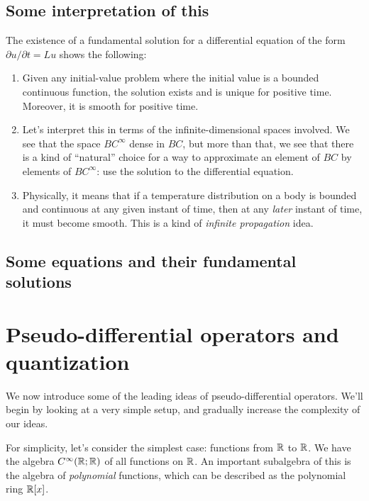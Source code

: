 \documentclass[a4paper]{amsart}
\begin{document}
\subsection{Some interpretation of this}

The existence of a fundamental solution for a differential equation of
the form $\partial u/\partial t = Lu$ shows the following:

\begin{enumerate}

\item Given any initial-value problem where the initial value is a
  bounded continuous function, the solution exists and is unique for
  positive time. Moreover, it is smooth for positive time.

\item Let's interpret this in terms of the infinite-dimensional spaces
  involved. We see that the space $BC^\infty$ dense in $BC$, but more
  than that, we see that there is a kind of ``natural'' choice for a
  way to approximate an element of $BC$ by elements of $BC^\infty$:
  use the solution to the differential equation.

\item Physically, it means that if a temperature distribution on a
  body is bounded and continuous at any given instant of time, then at
  any {\em later} instant of time, it must become smooth. This is a
  kind of {\em infinite propagation} idea.

\end{enumerate}

\subsection{Some equations and their fundamental solutions}

\section{Pseudo-differential operators and quantization}

We now introduce some of the leading ideas of pseudo-differential
operators. We'll begin by looking at a very simple setup, and
gradually increase the complexity of our ideas.

For simplicity, let's consider the simplest case: functions from $\mathbb{R}$
to $\mathbb{R}$. We have the algebra $C^\infty(\mathbb{R}; \mathbb{R})$ of all functions on
$\mathbb{R}$. An important subalgebra of this is the algebra of {\em
  polynomial} functions, which can be described as the polynomial ring
$\mathbb{R}[x]$.
\end{document}
